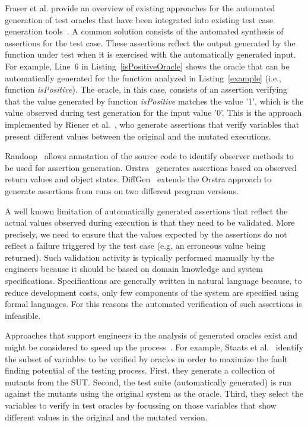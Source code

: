 Fraser et al. provide an overview of existing approaches for the automated generation of test oracles that have been integrated into existing test case generation tools~\cite{fraser2011mutation}.
A common solution consists of the automated synthesis of assertions for the test case. These assertions reflect the output generated by the function under test when it is exercised with the automatically generated input. 
For example, Line~6 in Listing~\ref{isPositiveOracle} shows the oracle that can be automatically generated for the function analyzed in Listing~\ref{example} (i.e., function \emph{isPositive}). The oracle, in this case, consists of an assertion verifying that the value generated by function \emph{isPositive} matches the value '1', which is the value observed during test generation for the input value '0'. This is the approach implemented by Riener et al.~\cite{riener2011test}, who generate assertions that verify variables that present different values between the original and the mutated executions.



Randoop~\cite{PachecoLEB2007} allows annotation of the source code to identify observer methods to be used for assertion generation. Orstra~\cite{Xie:2006} generates assertions based on observed return values and object states.
DiffGen~\cite{Taneja:2008} extends the Orstra approach to generate assertions from runs on two different program versions.

A well known limitation of automatically generated assertions that reflect the actual values observed during execution is that
they need to be validated. More precisely, we need to ensure that the values expected by the assertions do not reflect a failure triggered by the test case (e.g, an erroneous value being returned). Such validation activity is typically performed manually by the engineers because it should be based on domain knowledge and system specifications. 
Specifications are generally written in natural language because, to reduce development costs, only few components of the system are specified using formal languages. For this reasons the automated verification of such assertions is infeasible.

Approaches that support engineers in the analysis of generated oracles exist and might be considered to speed up the process~\cite{Staats2012,PastoreICSE2015}. For example, 
Staats et al.~\cite{Staats2012} identify the subset of variables to be verified by oracles in order to maximize the fault finding potential of the testing process.
First, they generate a collection of mutants from the SUT. Second, the test suite (automatically generated) is run against the mutants using the original system as the oracle. Third, they select the variables to verify in test oracles by focussing on those variables that show different values in the original and the mutated version.

